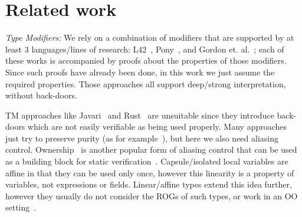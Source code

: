 
\saveSpace
\section{Related work}
\label{s:related}
\saveSpace

\textit{Type Modifiers:}
We rely on a combination of modifiers that are supported by at least 3 languages/lines of research:
L42~\cite{ServettoZucca15,ServettoEtAl13a,JOT:issue_2011_01/article1,GianniniEtAl16},
Pony~\cite{clebsch2015deny,clebsch2017orca}, and Gordon et. al.~\cite{GordonEtAl12}; 
each of these works is accompanied by proofs about the properties of those modifiers.
Since such proofs have already been done, in this work we just assume the required properties.
Those approaches all support deep/strong interpretation, without back-doors.

TM approaches like Javari~\cite{TschantzErnst05,Boyland06} and Rust~\cite{matsakis2014rust} are unsuitable since they introduce back-doors which are not easily verifiable as being used properly.
Many approaches just try to preserve purity (as for example~\cite{pearce2011jpure}), but here we also need aliasing control.
Ownership~\cite{ClarkeEtAl13,ZibinEtAl10,DietlEtAl07} is another popular form of aliasing control that can be used as a building block for static verification~\cite{%
muller2002modular,%
barnett2011specification%
}.
Capsule/isolated local variables are affine in that they can be used only once, however this linearity is a property of variables, not expressions or fields. Linear/affine types extend this idea further, however they usually do not consider the ROGs of such types, or work in an OO setting~\cite{ahmed20073,fahndrich2002adoption}.


